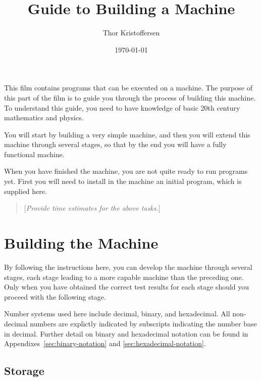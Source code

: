 \documentclass[a4paper,12pt]{article}
\author{Thor Kristoffersen}
\date{\today}
\title{Guide to Building a Machine}
\newcommand{\comment}[1]{\begin{quote}[\textit{#1}]\end{quote}}
\begin{document}
\maketitle

\noindent
This film contains programs that can be executed on a machine.
The purpose of this part of the film is to guide you through the process of building this machine.
To understand this guide, you need to have knowledge of basic 20th century mathematics and physics.

You will start by building a very simple machine, and then you will extend this machine through several stages, so that by the end you will have a fully functional machine.

When you have finished the machine, you are not quite ready to run programs yet.
First you will need to install in the machine an initial program, which is supplied here.

\comment{Provide time estimates for the above tasks.}

\section{Building the Machine}
\label{sec:building-machine}

By following the instructions here, you can develop the machine through several stages, each stage leading to a more capable machine than the preceding one.
Only when you have obtained the correct test results for each stage should you proceed with the following stage.

Number systems used here include decimal, binary, and hexadecimal.
All non-decimal numbers are explictly indicated by subscripts indicating the number base in decimal.
Further detail on binary and hexadecimal notation can be found in Appendixes~\ref{sec:binary-notation} and \ref{sec:hexadecimal-notation}.

\subsection{Storage}
\end{document}
